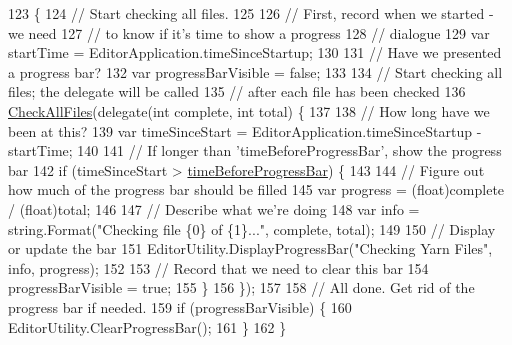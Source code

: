 \begin{DoxyCode}
123                                  \{
124             \textcolor{comment}{// Start checking all files.}
125 
126             \textcolor{comment}{// First, record when we started - we need}
127             \textcolor{comment}{// to know if it's time to show a progress}
128             \textcolor{comment}{// dialogue}
129             var startTime = EditorApplication.timeSinceStartup;
130 
131             \textcolor{comment}{// Have we presented a progress bar?}
132             var progressBarVisible = \textcolor{keyword}{false};
133 
134             \textcolor{comment}{// Start checking all files; the delegate will be called}
135             \textcolor{comment}{// after each file has been checked}
136             \hyperlink{a00162_a8e59ec20bd21bb1f8a6d4f02980f624b}{CheckAllFiles}(delegate(\textcolor{keywordtype}{int} complete, \textcolor{keywordtype}{int} total) \{
137 
138                 \textcolor{comment}{// How long have we been at this?}
139                 var timeSinceStart = EditorApplication.timeSinceStartup - startTime;
140 
141                 \textcolor{comment}{// If longer than 'timeBeforeProgressBar', show the progress bar}
142                 \textcolor{keywordflow}{if} (timeSinceStart > \hyperlink{a00162_a62a14b3fbaf2da41154ebad0eb7b6d3f}{timeBeforeProgressBar}) \{
143 
144                     \textcolor{comment}{// Figure out how much of the progress bar should be filled}
145                     var progress = (float)complete / (\textcolor{keywordtype}{float})total;
146 
147                     \textcolor{comment}{// Describe what we're doing}
148                     var info = string.Format(\textcolor{stringliteral}{"Checking file \{0\} of \{1\}..."}, complete, total);
149 
150                     \textcolor{comment}{// Display or update the bar }
151                     EditorUtility.DisplayProgressBar(\textcolor{stringliteral}{"Checking Yarn Files"}, info, progress);
152 
153                     \textcolor{comment}{// Record that we need to clear this bar}
154                     progressBarVisible = \textcolor{keyword}{true};
155                 \}
156             \});
157 
158             \textcolor{comment}{// All done. Get rid of the progress bar if needed.}
159             \textcolor{keywordflow}{if} (progressBarVisible) \{
160                 EditorUtility.ClearProgressBar();
161             \}
162         \}
\end{DoxyCode}
